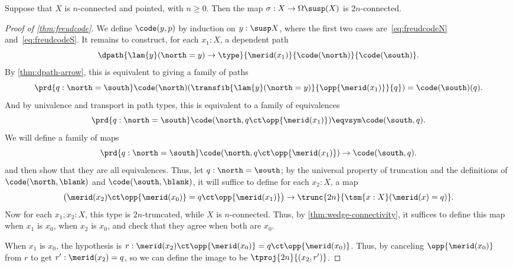 %
\begin{thm}\label{thm:freudenthal}
  Suppose that $X$ is $n$-connected and pointed, with $n\geq 0$.
  Then the map $\sigma:X\to \Omega\susp(X)$ is $2n$-connected.
\end{thm}

\begin{proof}[Proof of \cref{thm:freudcode}]
  We define $\code(y,p)$ by induction on $y:\susp X$, where the first two cases are~\eqref{eq:freudcodeN} and~\eqref{eq:freudcodeS}.
  It remains to construct, for each $x_1:X$, a dependent path
  \[ \dpath{\lam{y}(\north=y)\to\type}{\merid(x_1)}{\code(\north)}{\code(\south)}. \]
  By \cref{thm:dpath-arrow}, this is equivalent to giving a family of paths
  \[ \prd{q:\north=\south} \code(\north)(\transfib{\lam{y}(\north=y)}{\opp{\merid(x_1)}}{q}) = \code(\south)(q). \]
  And by univalence and transport in path types, this is equivalent to a family of equivalences
  \[ \prd{q:\north=\south} \code(\north,q \ct \opp{\merid(x_1)}) \eqvsym \code(\south,q). \]
  We will define a family of maps
  \begin{equation}\label{eq:freudmap}
    \prd{q:\north=\south} \code(\north,q \ct \opp{\merid(x_1)}) \to \code(\south,q).
  \end{equation}
  and then show that they are all equivalences.
  Thus, let $q:\north=\south$; by the universal property of truncation and the definitions of $\code(\north,\blank)$ and $\code(\south,\blank)$, it will suffice to define for each $x_2:X$, a map
  \begin{equation*}
    \big(\merid(x_2)\ct \opp{\merid(x_0)} = q \ct \opp{\merid(x_1)}\big)
    \to \trunc{2n}{\tsm{x:X} (\merid(x) = q)}.
  \end{equation*}
  Now for each $x_1,x_2:X$, this type is $2n$-truncated, while $X$ is $n$-connected.
  Thus, by \cref{thm:wedge-connectivity}, it suffices to define this map when $x_1$ is $x_0$, when $x_2$ is $x_0$, and check that they agree when both are $x_0$.

  When $x_1$ is $x_0$, the hypothesis is $r:\merid(x_2)\ct \opp{\merid(x_0)} = q \ct \opp{\merid(x_0)}$.
  Thus, by canceling $\opp{\merid(x_0)}$ from $r$ to get $r':\merid(x_2)=q$, so we can define the image to be $\tproj{2n}{(x_2,r')}$.


\end{proof}
